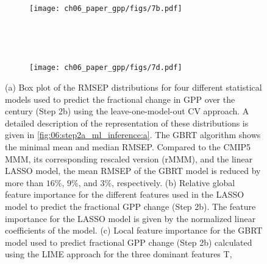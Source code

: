 \begin{figure}[p]
  \centering
  \begin{subfigure}[b]{\SubfigureWidth{}}
    \caption{}
    \label{fig:06:step2b_ml_inference:a}
  \end{subfigure}
  ~
  \begin{subfigure}[b]{\SubfigureWidth{}}
    \texttt{[image: ch06\_paper\_gpp/figs/7b.pdf]}
    \caption{}
    \label{fig:06:step2b_ml_inference:b}
  \end{subfigure}
  \\
  \begin{subfigure}[b]{\SubfigureWidth{}}
    \caption{}
    \label{fig:06:step2b_ml_inference:c}
  \end{subfigure}
  ~
  \begin{subfigure}[b]{\SubfigureWidth{}}
    \texttt{[image: ch06\_paper\_gpp/figs/7d.pdf]}
    \caption{}
    \label{fig:06:step2b_ml_inference:d}
  \end{subfigure}
  \caption[
    Prediction error in a leave-one-model-out \acl{CV} setup and feature
    importance of our \acl{ML} approach to constrain the fractional change in
    \acf{GPP} over the  century in Step 2b.
  ]{
    (a) Box plot of the \acf{RMSEP} distributions for four different
    statistical models used to predict the fractional change in \acf{GPP} over
    the  century (Step 2b) using the leave-one-model-out \acl{CV}
    approach. A detailed description of the representation of these
    distributions is given in \cref{fig:06:step2a_ml_inference:a}. The
    \acf{GBRT} algorithm shows the minimal mean and median \acs{RMSEP}.
    Compared to the \acs{CMIP}5 \acf{MMM}, its corresponding rescaled version
    (r\acs{MMM}), and the linear \acf{LASSO} model, the mean \acs{RMSEP} of the
    \acs{GBRT} model is reduced by more than $16 \unit{\%}$, $9 \unit{\%}$, and
    $3 \unit{\%}$, respectively. (b) Relative global feature importance for the
    different features used in the \acs{LASSO} model to predict the fractional
    \acs{GPP} change (Step 2b). The feature importance for the \acs{LASSO}
    model is given by the normalized linear coefficients of the model. (c)
    Local feature importance for the \acs{GBRT} model used to predict
    fractional \acs{GPP} change (Step 2b) calculated using the \acf{LIME}
    approach \autocite{Ribeiro2016} for the three dominant features \acf{T},
}
\end{figure}

